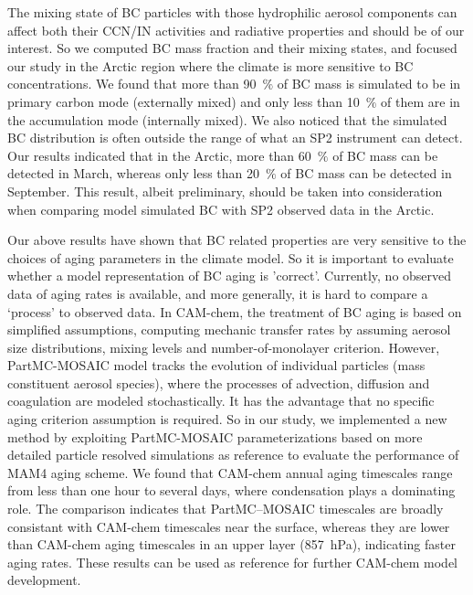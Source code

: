 \documentclass[12pt, fullpage]{uiucthesis2009_2}
\begin{document}
		The mixing state of BC particles with those hydrophilic aerosol components can affect both their CCN/IN activities and radiative properties and should be of our interest. So we computed BC mass fraction and their mixing states, and focused our study in the Arctic region where the climate is more sensitive to BC concentrations. We found that more than 90~$\%$ of BC mass is simulated to be in primary carbon mode (externally mixed) and only less than 10~$\%$ of them are in the accumulation mode (internally mixed). We also noticed that the simulated BC distribution is often outside the range of what an SP2 instrument can detect. Our results indicated that in the Arctic, more than 60~$\%$ of BC mass can be detected in March, whereas only less than 20~$\%$ of BC mass can be detected in September. This result, albeit preliminary, should be taken into consideration when comparing model simulated BC with SP2 observed data in the Arctic. 
 
		Our above results have shown that BC related properties are very sensitive to the choices of aging parameters in the climate model. So it is important to evaluate whether a model representation of BC aging is 'correct'. Currently, no observed data of aging rates is available, and more generally, it is hard to compare a ‘process’ to observed data. In CAM-chem, the treatment of BC aging is based on simplified assumptions, computing mechanic transfer rates by assuming aerosol size distributions, mixing levels and number-of-monolayer criterion. However, PartMC-MOSAIC model tracks the evolution of individual particles (mass constituent aerosol species), where the processes of advection, diffusion and coagulation are modeled stochastically. It has the advantage that no specific aging criterion assumption is required. So in our study, we implemented a new method by exploiting PartMC-MOSAIC parameterizations based on more detailed particle resolved simulations as reference to evaluate the performance of MAM4 aging scheme. We found that CAM-chem annual aging timescales range from less than one hour to several days, where condensation plays a dominating role. The comparison indicates that PartMC--MOSAIC timescales are broadly consistant with CAM-chem timescales near the surface, whereas they are lower than CAM-chem aging timescales in an upper layer (857~hPa), indicating faster aging rates. These results can be used as reference for further CAM-chem model development.
		
\end{document}

